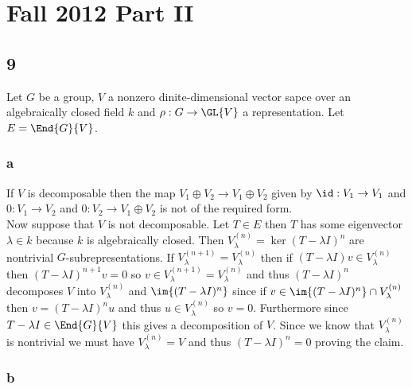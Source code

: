 \documentclass[12pt]{article}
\begin{document}
\section{Fall 2012 Part II}

\subsection{9}

Let $G$ be a group, $V$ a nonzero dinite-dimensional vector sapce over an algebraically closed field $k$ and $\rho : G \to \GL{V}$ a representation. Let $E = \End{G}{V}$. 

\subsubsection{a}

If $V$ is decomposable then the map $V_1 \oplus V_2 \to V_1 \oplus V_2$ given by $\id : V_1 \to V_1$ and $0 : V_1 \to V_2$ and $0 : V_2 \to V_1 \oplus V_2$ is not of the required form. 
\bigskip\\
Now suppose that $V$ is not decomposable. Let $T \in E$ then $T$ has some eigenvector $\lambda \in k$ because $k$ is algebraically closed. Then $V_\lambda^{(n)} = \ker{(T - \lambda I)^n}$ are nontrivial $G$-subrepresentations. If $V_\lambda^{(n+1)} = V_\lambda^{(n)}$ then if $(T - \lambda I) v \in V_\lambda^{(n)}$ then $(T - \lambda I)^{n+1} v = 0$ so $v \in V_\lambda^{(n+1)} = V_\lambda^{(n)}$ and thus $(T - \lambda I)^n$ decomposes $V$ into $V_\lambda^{(n)}$ and $\im{(T - \lambda I)^n}$ since if $v \in \im{(T - \lambda I)^n} \cap V_\lambda^{(n)}$ then $v = (T - \lambda I)^n u$ and thus $u \in V_\lambda^{(n)}$ so $v = 0$. Furthermore since $T - \lambda I \in \End{G}{V}$ this gives a decomposition of $V$. Since we know that $V_\lambda^{(n)}$ is nontrivial we must have $V_\lambda^{(n)} = V$ and thus $(T - \lambda I)^n = 0$ proving the claim.

\subsubsection{b}
\end{document}
